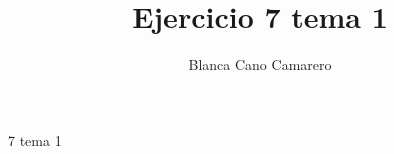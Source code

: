 \documentclass[a4paper , 14pt, spanish ]{article}
\begin{document}







\raggedright
\title{Ejercicio 7 tema 1}
\author{Blanca Cano Camarero}


\begin{table}[ht]

\end{table}%

\setlength{\parindent}{10ex} %

\begin{Proof}{7 tema 1}{}


\end{Proof}
\end{document}
